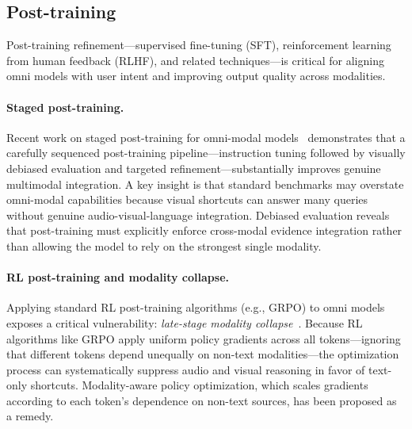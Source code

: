 \documentclass{article}
\begin{document}
\subsection{Post-training}

Post-training refinement---supervised fine-tuning (SFT), reinforcement learning from human feedback (RLHF), and related techniques---is critical for aligning omni models with user intent and improving output quality across modalities.

\paragraph{Staged post-training.}
Recent work on staged post-training for omni-modal models~\cite{placeholder2026stagedposttraining} demonstrates that a carefully sequenced post-training pipeline---instruction tuning followed by visually debiased evaluation and targeted refinement---substantially improves genuine multimodal integration.
A key insight is that standard benchmarks may overstate omni-modal capabilities because visual shortcuts can answer many queries without genuine audio-visual-language integration.
Debiased evaluation reveals that post-training must explicitly enforce cross-modal evidence integration rather than allowing the model to rely on the strongest single modality.

\paragraph{RL post-training and modality collapse.}
Applying standard RL post-training algorithms (e.g., GRPO) to omni models exposes a critical vulnerability: \emph{late-stage modality collapse}~\cite{placeholder2026escapelanguage}.
Because RL algorithms like GRPO apply uniform policy gradients across all tokens---ignoring that different tokens depend unequally on non-text modalities---the optimization process can systematically suppress audio and visual reasoning in favor of text-only shortcuts.
Modality-aware policy optimization, which scales gradients according to each token's dependence on non-text sources, has been proposed as a remedy.
\end{document}

